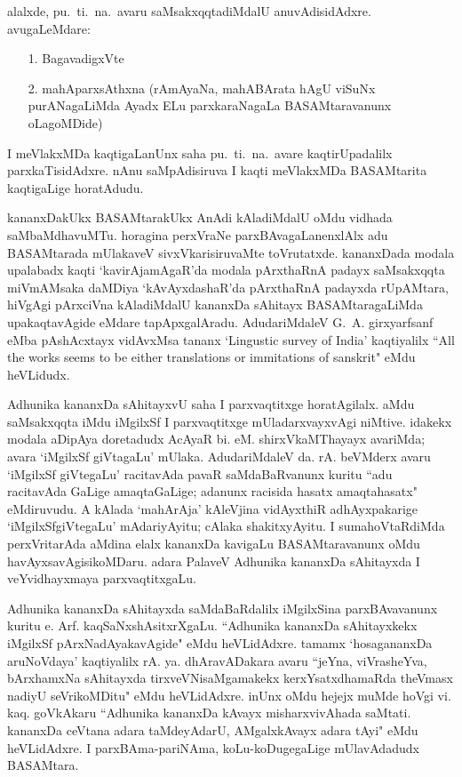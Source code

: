 alalxde, pu.~ti.~na.~avaru saMsakxqqtadiMdalU anuvAdisidAdxre. avugaLeMdare:
\begin{itemize}
\item[1.] BagavadigxVte
\item[2.] mahAparxsAthxna (rAmAyaNa, mahABArata hAgU viSuNx purANagaLiMda Ayadx ELu parxkaraNagaLa BASAMtaravanunx oLagoMDide)
\end{itemize}

I meVlakxMDa kaqtigaLanUnx saha pu.~ti.~na.~avare kaqtirUpadalilx parxkaTisidAdxre. nAnu saMpAdisiruva I kaqti meVlakxMDa BASAMtarita kaqtigaLige horatAdudu.

kananxDakUkx BASAMtarakUkx AnAdi kAladiMdalU oMdu vidhada saMbaMdhavuMTu. horagina perxVraNe parxBAvagaLanenxlAlx adu BASAMtarada mUlakaveV sivxVkarisiruvaMte toVrutatxde. kananxDada modala upalabadx kaqti `kavirAjamAgaR'da modala pArxthaRnA padayx saMsakxqqta miVmAMsaka daMDiya `kAvAyxdashaR'da pArxthaRnA padayxda rUpAMtara, hiVgAgi pArxciVna kAladiMdalU kananxDa sAhitayx BASAMtaragaLiMda upakaqtavAgide eMdare tapApxgalAradu. AdudariMdaleV {\rm G.~A.} girxyarfsanf eMba pAshAcxtayx vidAvxMsa tananx {\rm `Lingustic survey of India'} kaqtiyalilx {\rm ``All the works seems to be either translations or immitations of sanskrit"} eMdu heVLidudx.

Adhunika kananxDa sAhitayxvU saha I parxvaqtitxge horatAgilalx. aMdu saMsakxqqta iMdu iMgilxSf I parxvaqtitxge mUladarxvayxvAgi niMtive. idakekx modala aDipAya doretadudx AcAyaR bi. eM. shirxVkaMThayayx avariMda; avara `iMgilxSf giVtagaLu' mUlaka. AdudariMdaleV da. rA. beVMderx avaru `iMgilxSf giVtegaLu' racitavAda pavaR saMdaBaRvanunx kuritu ``adu racitavAda  GaLige amaqtaGaLige; adanunx racisida hasatx amaqtahasatx" eMdiruvudu. A kAlada `mahArAja' kAleVjina vidAyxthiR adhAyxpakarige `iMgilxSfgiVtegaLu' mAdariyAyitu; cAlaka shakitxyAyitu. I sumahoVtaRdiMda perxVritarAda aMdina elalx kananxDa kavigaLu BASAMtaravanunx oMdu havAyxsavAgisikoMDaru. adara PalaveV Adhunika kananxDa sAhitayxda I veYvidhayxmaya parxvaqtitxgaLu.

Adhunika kananxDa sAhitayxda saMdaBaRdalilx iMgilxSina parxBAvavanunx kuritu e. Arf. kaqSaNxshAsitxrXgaLu. ``Adhunika kananxDa sAhitayxkekx iMgilxSf pArxNadAyakavAgide" eMdu heVLidAdxre. tamamx `hosagananxDa aruNoVdaya' kaqtiyalilx rA. ya. dhAravADakara avaru ``jeYna, viVrasheYva, bArxhamxNa sAhitayxda tirxveVNisaMgamakekx kerxYsatxdhamaRda theVmasx nadiyU seVrikoMDitu" eMdu heVLidAdxre. inUnx oMdu hejejx muMde hoVgi vi. kaq. goVkAkaru ``Adhunika kananxDa kAvayx misharxvivAhada saMtati. kananxDa ceVtana adara taMdeyAdarU, AMgalxkAvayx adara tAyi" eMdu heVLidAdxre. I parxBAma-pariNAma, koLu-koDugegaLige mUlavAdadudx BASAMtara.  


